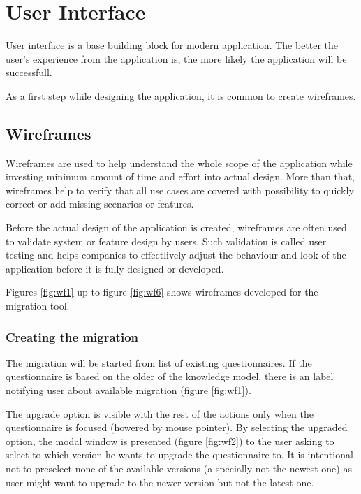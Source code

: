 \section{User Interface}\label{sec:user-interface}

User interface is a base building block for modern application.
The better the user's experience from the application is, the more likely the application will be successfull\cite{dciw-ux-ui}.

As a first step while designing the application, it is common to create wireframes.

\subsection{Wireframes}\label{sec:wireframes}

Wireframes are used to help understand the whole scope of the application while investing minimum amount of time and effort into actual design.
More than that, wireframes help to verify that all use cases are covered with possibility to quickly correct or add missing scenarios or features.

Before the actual design of the application is created, wireframes are often used to validate system or feature design by users.
Such validation is called user testing and helps companies to effectlively adjust the behaviour and look of the application before it is fully designed or developed.

Figures \ref{fig:wf1} up to figure \ref{fig:wf6} shows wireframes developed for the migration tool.

\subsubsection*{Creating the migration}

The migration will be started from list of existing questionnaires.
If the questionnaire is based on the older of the knowledge model, there is an label notifying user about available migration (figure \ref{fig:wf1}).

The upgrade option is visible with the rest of the actions only when the questionnaire is focused (howered by mouse pointer).
By selecting the upgraded option, the modal window is presented (figure \ref{fig:wf2}) to the user asking to select to which version he wants to upgrade the questionnaire to.
It is intentional not to preselect none of the available versions (a specially not the newest one) as user might want to upgrade to the newer version but not the latest one.

